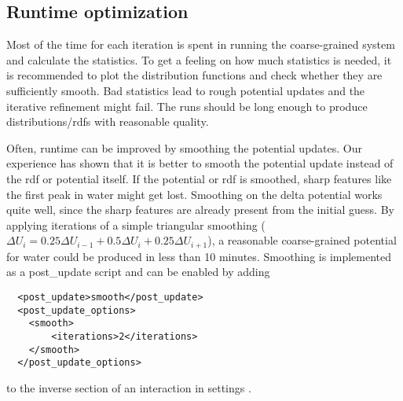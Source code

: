 \subsection{Runtime optimization}
\label{ref:ibi:optimize}
Most of the time for each iteration is spent in running the coarse-grained system and calculate the statistics. To get a feeling on how much statistics is needed, it is recommended to plot the distribution functions and check whether they are sufficiently smooth. Bad statistics lead to rough potential updates and the iterative refinement might fail. The runs should be long enough to produce distributions/rdfs with reasonable quality.

Often, runtime can be improved by smoothing the potential updates. Our experience has shown that it is better to smooth the potential update instead of the rdf or potential itself. If the potential or rdf is smoothed, sharp features like the first peak in \spce water might get lost. Smoothing on the delta potential works quite well, since the sharp features are already present from the initial guess. By applying iterations of a simple triangular smoothing ($ \Delta U_i = 0.25 \Delta U_{i-1} + 0.5\Delta U_i + 0.25\Delta U_{i+1} $), a reasonable coarse-grained potential for \spce water could be produced in less than 10 minutes. Smoothing is implemented as a post\_update script and can be enabled by adding
\begin{lstlisting}
  <post_update>smooth</post_update>
  <post_update_options>
    <smooth>
        <iterations>2</iterations>
    </smooth>
  </post_update_options>
\end{lstlisting}
to the inverse section of an interaction in settings \xml.



